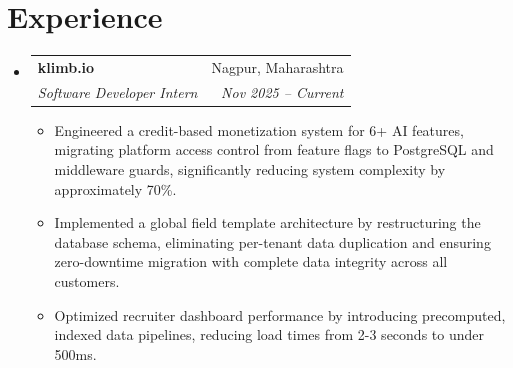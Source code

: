 \documentclass[letterpaper,10pt]{article}
\makeatletter
\newenvironment{resumeList}{
  \begin{itemize}[leftmargin=0.15in, label={}]
}{
  \end{itemize}
}
\newcommand{\resumeItem}[1]{
  \item\small{
    {#1 \vspace{-2.5pt}}
  }
}
\newcommand{\resumeSubheading}[4]{
  \vspace{-2pt}\item
    \begin{tabular*}{0.97\textwidth}[t]{l@{\extracolsep{\fill}}r}
      \textbf{#1} & #2 \\
      \textit{\small#3} & \textit{\small #4} \\
    \end{tabular*}\vspace{-6pt}
}
\newcommand{\resumeItemListStart}{\begin{itemize}[leftmargin=0.15in]}
\newcommand{\resumeItemListEnd}{\end{itemize}\vspace{-5pt}}
\makeatother
\begin{document}
\section{Experience}
\begin{resumeList}
    \resumeSubheading
    {klimb.io}{Nagpur, Maharashtra}
    {Software Developer Intern}{Nov 2025 – Current}
  \resumeItemListStart
    \resumeItem{Engineered a credit-based monetization system for 6+ AI features, migrating platform access control from feature flags to PostgreSQL and middleware guards, significantly reducing system complexity by approximately 70\%.}
    \resumeItem{Implemented a global field template architecture by restructuring the database schema, eliminating per-tenant data duplication and ensuring zero-downtime migration with complete data integrity across all customers.}
    \resumeItem{Optimized recruiter dashboard performance by introducing precomputed, indexed data pipelines, reducing load times from 2-3 seconds to under 500ms.}
  \resumeItemListEnd
\end{resumeList}

\end{document}
